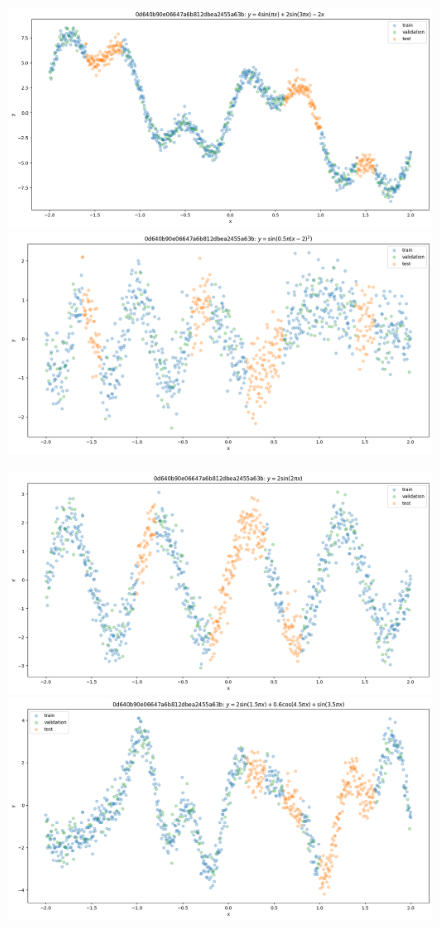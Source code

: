 \documentclass{article}
\numberwithin{equation}{section}
\begin{document}
\begin{figure}[h!]
\begin{minipage}{.49\textwidth}
  \includegraphics[width=\linewidth]{thesis-report/figures/toy_curves/data/curve6/data.png}
  \includegraphics[width=\linewidth]{thesis-report/figures/toy_curves/data/curve8/data.png}
\end{minipage}%
\begin{minipage}{.49\textwidth}
  \centering
  \includegraphics[width=\linewidth]{thesis-report/figures/toy_curves/data/curve1/data.png}
  \includegraphics[width=\linewidth]{thesis-report/figures/toy_curves/data/curve3/data.png}

\end{minipage}
\end{figure}
\end{document}
